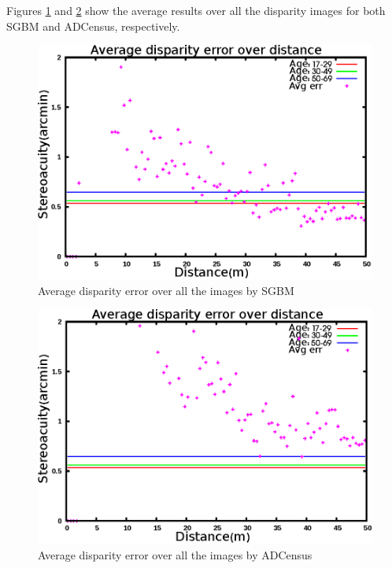 \noindent
Figures \ref{fig:mskmapsgbm1000} and \ref{fig:mskmapadc1000} show the average results over all the disparity images for both SGBM and ADCensus, respectively.

\begin{figure}[H]
\centering
\includegraphics[scale=0.95]{sgbmmsk1000}
\caption{Average disparity error over all the images by SGBM}
\label{fig:mskmapsgbm1000}
\end{figure} 
\begin{figure}[H]
\centering
\includegraphics[scale=0.95]{adcenmsk1000}
\caption{Average disparity error over all the images by ADCensus}
\label{fig:mskmapadc1000}
\end{figure} 

